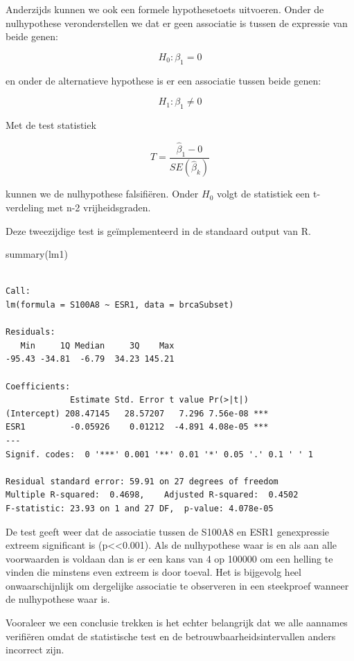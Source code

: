 \documentclass[
  dutch,
  letterpaper,
  12pt]{book}
\newenvironment{Shaded}{\begin{snugshade}}{\end{snugshade}}
\newcommand{\FunctionTok}[1]{\textcolor[rgb]{0.28,0.35,0.67}{#1}}
\newcommand{\NormalTok}[1]{\textcolor[rgb]{0.00,0.23,0.31}{#1}}
\theoremstyle{definition}
\theoremstyle{definition}
\theoremstyle{definition}
\theoremstyle{remark}
\begin{document}
Anderzijds kunnen we ook een formele hypothesetoets uitvoeren. Onder de
nulhypothese veronderstellen we dat er geen associatie is tussen de
expressie van beide genen:

\[H_0: \beta_1=0\]

en onder de alternatieve hypothese is er een associatie tussen beide
genen:

\[H_1: \beta_1\neq0\]

Met de test statistiek

\[T=\frac{\hat{\beta}_1-0}{SE(\hat{\beta}_k)}\]

kunnen we de nulhypothese falsifiëren. Onder \(H_0\) volgt de statistiek
een t-verdeling met n-2 vrijheidsgraden.

Deze tweezijdige test is geïmplementeerd in de standaard output van R.

\begin{Shaded}
\begin{Highlighting}[]
\FunctionTok{summary}\NormalTok{(lm1)}
\end{Highlighting}
\end{Shaded}

\begin{verbatim}

Call:
lm(formula = S100A8 ~ ESR1, data = brcaSubset)

Residuals:
   Min     1Q Median     3Q    Max 
-95.43 -34.81  -6.79  34.23 145.21 

Coefficients:
             Estimate Std. Error t value Pr(>|t|)    
(Intercept) 208.47145   28.57207   7.296 7.56e-08 ***
ESR1         -0.05926    0.01212  -4.891 4.08e-05 ***
---
Signif. codes:  0 '***' 0.001 '**' 0.01 '*' 0.05 '.' 0.1 ' ' 1

Residual standard error: 59.91 on 27 degrees of freedom
Multiple R-squared:  0.4698,    Adjusted R-squared:  0.4502 
F-statistic: 23.93 on 1 and 27 DF,  p-value: 4.078e-05
\end{verbatim}

De test geeft weer dat de associatie tussen de S100A8 en ESR1
genexpressie extreem significant is (p\textless\textless0.001). Als de
nulhypothese waar is en als aan alle voorwaarden is voldaan dan is er
een kans van 4 op 100000 om een helling te vinden die minstens even
extreem is door toeval. Het is bijgevolg heel onwaarschijnlijk om
dergelijke associatie te observeren in een steekproef wanneer de
nulhypothese waar is.

Vooraleer we een conclusie trekken is het echter belangrijk dat we alle
aannames verifiëren omdat de statistische test en de
betrouwbaarheidsintervallen anders incorrect zijn.
\end{document}

